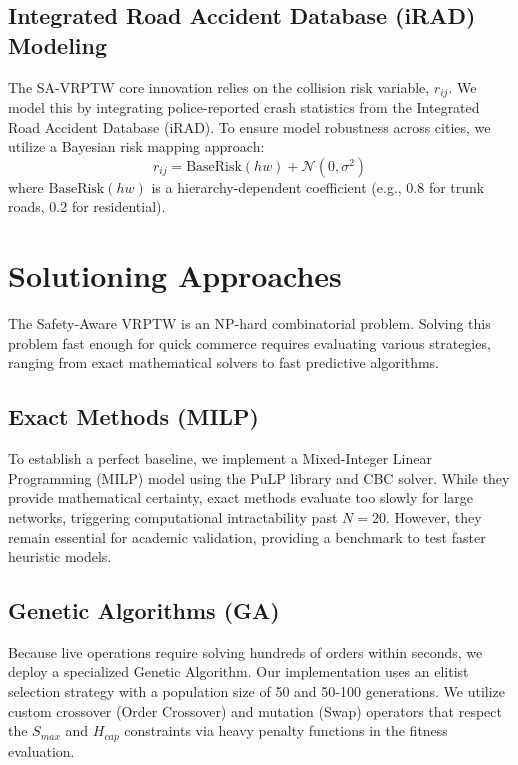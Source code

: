 \documentclass[10pt,twocolumn,letterpaper]{article}
\begin{document}
\subsection{Integrated Road Accident Database (iRAD) Modeling}

The SA-VRPTW core innovation relies on the collision risk variable, $r_{ij}$. We model this by integrating police-reported crash statistics from the Integrated Road Accident Database (iRAD). To ensure model robustness across cities, we utilize a Bayesian risk mapping approach:
\begin{equation}
r_{ij} = \text{BaseRisk}(hw) + \mathcal{N}(0, \sigma^2)
\end{equation}
where $\text{BaseRisk}(hw)$ is a hierarchy-dependent coefficient (e.g., 0.8 for trunk roads, 0.2 for residential).

\section{Solutioning Approaches}

The Safety-Aware VRPTW is an NP-hard combinatorial problem. Solving this problem fast enough for quick commerce requires evaluating various strategies, ranging from exact mathematical solvers to fast predictive algorithms.

\subsection{Exact Methods (MILP)}

To establish a perfect baseline, we implement a Mixed-Integer Linear Programming (MILP) model using the PuLP library and CBC solver. While they provide mathematical certainty, exact methods evaluate too slowly for large networks, triggering computational intractability past $N=20$. However, they remain essential for academic validation, providing a benchmark to test faster heuristic models.

\subsection{Genetic Algorithms (GA)}

Because live operations require solving hundreds of orders within seconds, we deploy a specialized Genetic Algorithm. Our implementation uses an elitist selection strategy with a population size of 50 and 50-100 generations. We utilize custom crossover (Order Crossover) and mutation (Swap) operators that respect the $S_{max}$ and $H_{cap}$ constraints via heavy penalty functions in the fitness evaluation.
\end{document}
